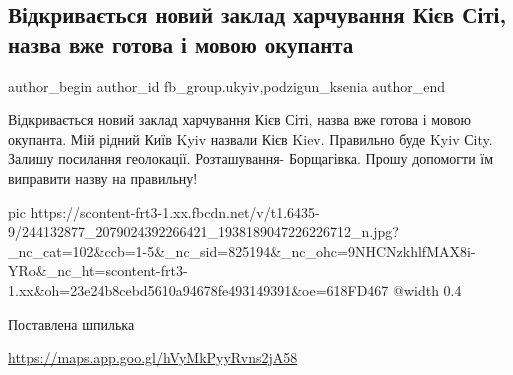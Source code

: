 
 
 
 
 
 
\subsection{Відкривається новий заклад харчування Кієв Сіті, назва вже готова і мовою окупанта}
\label{sec:01_10_2021.fb.fb_group.ukyiv.1.kiev_city_kafe}
 
\ifcmt
 author_begin
   author_id fb_group.ukyiv,podzigun_ksenia
 author_end
\fi

Відкривається новий заклад харчування Кієв Сіті, назва вже готова і мовою
окупанта.  Мій рідний Київ Kyiv назвали Кієв Kiev.  Правильно буде Kyiv Сity.
Залишу посилання геолокації. Розташування- Борщагівка. Прошу допомогти їм
виправити назву на правильну! 

\ifcmt
  pic https://scontent-frt3-1.xx.fbcdn.net/v/t1.6435-9/244132877_2079024392266421_1938189047226226712_n.jpg?_nc_cat=102&ccb=1-5&_nc_sid=825194&_nc_ohc=9NHCNzkhlfMAX8i-YRo&_nc_ht=scontent-frt3-1.xx&oh=23e24b8cebd5610a94678fe493149391&oe=618FD467
  @width 0.4
\fi

Поставлена шпилька

\url{https://maps.app.goo.gl/hVyMkPyyRvns2jA58}

